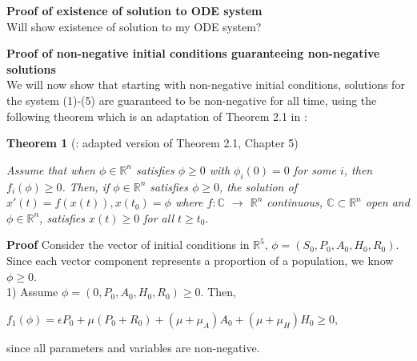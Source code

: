 \documentclass[12pt]{article}
\begin{document}




 \textbf{Proof of existence of solution to ODE system} \\
Will show existence of solution to my ODE system?







\textbf{Proof of non-negative initial conditions guaranteeing non-negative solutions} \\
We will now show that starting with non-negative initial conditions, solutions for the system (1)-(5) are guaranteed to be non-negative for all time, using the following theorem which is an adaptation of Theorem 2.1 in \cite{Smith}: 
 
 \textbf{Theorem 1} (\cite{Smith}: adapted version of Theorem 2.1, Chapter 5) 

 \textit{Assume that when $\phi \in \mathbb{R}^n$ satisfies $\phi \geq 0$ with $\phi_{i}(0)=0$ for some $i$, then $f_i(\phi) \geq 0$. Then, if $\phi \in \mathbb{R}^n$ satisfies $\phi \geq 0$, the solution of $x'(t)=f(x(t)), x(t_{0})=\phi$ where $f: \mathbb{C}$ $\rightarrow$ $\mathbb{R}^n$ continuous, $\mathbb{C} \subset \mathbb{R}^n$ open and $\phi \in \mathbb{R}^n$, satisfies $x(t) \geq 0$ for all $t \geq t_{0}.$}
 
 \textbf{Proof} Consider the vector of initial conditions in $\mathbb{R}^5$, $\phi = (S_0, P_0, A_0, H_0, R_0).$ Since each vector component represents a proportion of a population, we know $\phi \geq 0.$ \\
 
1) Assume $\phi = (0, P_0, A_0, H_0, R_0) \geq 0.$ Then, 
\begin{center}
$f_1(\phi)=\epsilon P_0 + \mu (P_0+R_0)+(\mu + \mu_A) A_0 + (\mu+\mu_H) H_0 \geq 0,$
\end{center}
since all parameters and variables are non-negative. 
 
\end{document}

